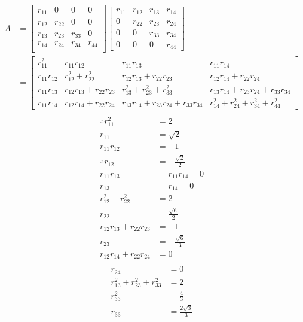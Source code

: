\documentclass{article}
\begin{document}
\begin{enumerate}
\begin{align*}
A& = \begin{bmatrix}
r_{11}&0&0&0\\
r_{12}&r_{22}&0&0\\
r_{13}&r_{23}&r_{33}&0\\
r_{14}&r_{24}&r_{34}&r_{44}\\
\end{bmatrix} \begin{bmatrix}
r_{11}&r_{12}&r_{13}&r_{14}\\
0&r_{22}&r_{23}&r_{24}\\
0&0&r_{33}&r_{34}\\
0&0&0&r_{44}
\end{bmatrix}\\
&=\begin{bmatrix}
r_{11}^2&r_{11}r_{12}&r_{11}r_{13}&r_{11}r_{14}\\
r_{11}r_{12}&r_{12}^2+r_{22}^2&r_{12}r_{13}+r_{22}r_{23}&r_{12}r_{14}+r_{22}r_{24}\\
r_{11}r_{13}&r_{12}r_{13}+r_{22}r_{23}&r_{13}^2+r_{23}^2+r_{33}^2 &r_{13}r_{14}+r_{23}r_{24}+r_{33}r_{34}\\
r_{11}r_{14}&r_{12}r_{14}+r_{22}r_{24}&r_{13}r_{14}+r_{23}r_{24}+r_{33}r_{34}&r_{14}^2+r_{24}^2+r_{34}^2+r_{44}^2
\end{bmatrix}\\
\end{align*}
\begin{align*}
\therefore r_{11}^2 &=2\\
r_{11}&=\sqrt{2}\\
r_{11}r_{12}&=-1\\
\therefore r_{12}&=-\frac{\sqrt{2}}{2}\\
r_{11}r_{13}&=r_{11}r_{14}=0\\
r_{13}&=r_{14}=0\\
r_{12}^2+r_{22}^2&=2\\
r_{22}&=\frac{\sqrt{6}}{2}\\
r_{12}r_{13}+r_{22}r_{23}&=-1\\
r_{23}&=-\frac{\sqrt{6}}{3}\\
r_{12}r_{14}+r_{22}r_{24}&=0\\
\end{align*}
\begin{align*}
r_{24}&=0\\r_{13}^2+r_{23}^2+r_{33}^2&=2\\
r_{33}^2&=\frac{4}{3}\\r_{33}&=\frac{2\sqrt{3}}{3}\\

\end{align*}
\end{enumerate}
\end{document}
